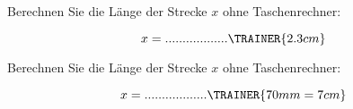 
\begin{frage}[2]
 Berechnen Sie die Länge der Strecke $x$ ohne Taschenrechner: 
\begin{center}
\end{center}

$$x=..................\TRAINER{2.3cm}$$
  
\end{frage}
  

\begin{frage}[2]
 Berechnen Sie die Länge der Strecke $x$ ohne Taschenrechner: 
\begin{center}
\end{center}

$$x=..................\TRAINER{70mm = 7cm}$$
  
\end{frage}

